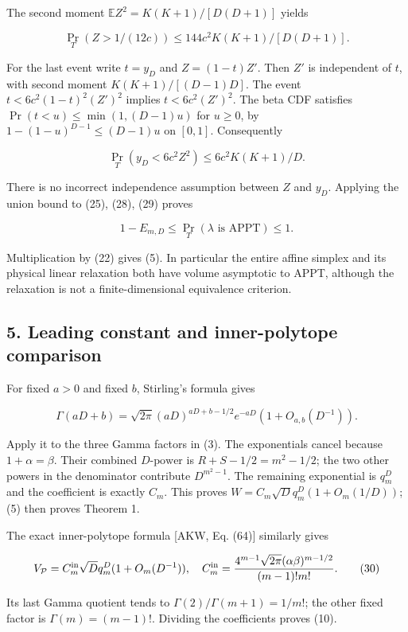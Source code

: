 \documentclass[
  11pt,
]{article}
\begin{document}
The second moment \(\mathbb EZ^2=K(K+1)/[D(D+1)]\) yields

\[
\Pr_T(Z>1/(12c))\leq144c^2K(K+1)/[D(D+1)].
\tag{28}
\]

For the last event write \(t=y_D\) and \(Z=(1-t)Z'\). Then \(Z'\) is
independent of \(t\), with second moment \(K(K+1)/[(D-1)D]\). The event
\(t<6c^2(1-t)^2(Z')^2\) implies \(t<6c^2(Z')^2\). The beta CDF satisfies
\(\Pr(t<u)\leq\min(1,(D-1)u)\) for \(u\geq0\), by
\(1-(1-u)^{D-1}\leq(D-1)u\) on \([0,1]\). Consequently

\[
\Pr_T(y_D<6c^2Z^2)\leq6c^2K(K+1)/D.
\tag{29}
\]

There is no incorrect independence assumption between \(Z\) and \(y_D\).
Applying the union bound to (25), (28), (29) proves

\[
1-E_{m,D}\leq\Pr_T(\lambda\text{ is APPT})\leq1.
\]

Multiplication by (22) gives (5). In particular the entire affine
simplex and its physical linear relaxation both have volume asymptotic
to APPT, although the relaxation is not a finite-dimensional equivalence
criterion.

\hypertarget{leading-constant-and-inner-polytope-comparison}{%
\subsection{5. Leading constant and inner-polytope
comparison}\label{leading-constant-and-inner-polytope-comparison}}

For fixed \(a>0\) and fixed \(b\), Stirling's formula gives

\[
\Gamma(aD+b)=\sqrt{2\pi}(aD)^{aD+b-1/2}e^{-aD}(1+O_{a,b}(D^{-1})).
\]

Apply it to the three Gamma factors in (3). The exponentials cancel
because \(1+\alpha=\beta\). Their combined \(D\text{-power}\) is
\(R+S-1/2=m^2-1/2\); the two other powers in the denominator contribute
\(D^{m^2-1}\). The remaining exponential is \(q_m^D\) and the
coefficient is exactly \(C_m\). This proves
\(W=C_m\sqrt Dq_m^D(1+O_m(1/D))\); (5) then proves Theorem 1.

The exact inner-polytope formula {[}AKW, Eq. (64){]} similarly gives

\[
V_{\mathcal P}=C_m^{\rm in}\sqrt D q_m^D(1+O_m(D^{-1})),\quad
C_m^{\rm in}=\frac{4^{m-1}\sqrt{2\pi}(\alpha\beta)^{m-1/2}}{(m-1)!m!}.
\tag{30}
\]

Its last Gamma quotient tends to \(\Gamma(2)/\Gamma(m+1)=1/m!\); the
other fixed factor is \(\Gamma(m)=(m-1)!\). Dividing the coefficients
proves (10).
\end{document}
